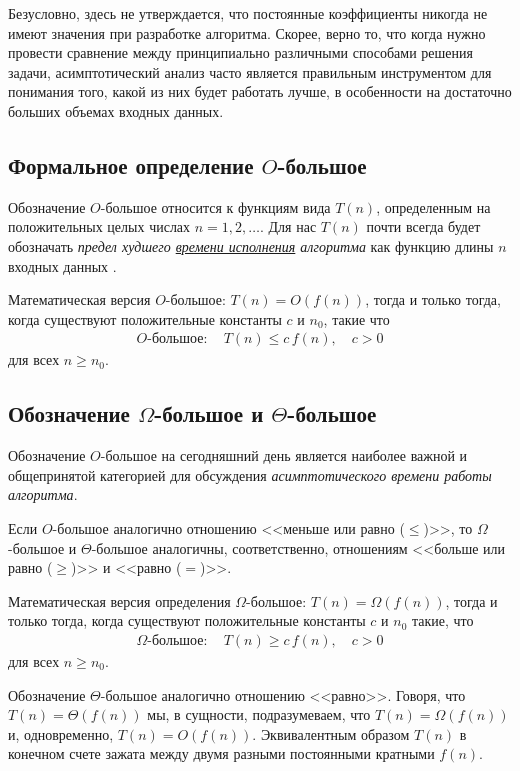 \documentclass[%
	11pt,
	a4paper,
	utf8,
		]{article}
\begin{document}
Безусловно, здесь не утверждается, что постоянные коэффициенты никогда не имеют значения при разработке алгоритма. Скорее, верно то, что когда нужно провести сравнение между принципиально различными способами решения задачи, асимптотический анализ часто является правильным инструментом для понимания того, какой из них будет работать лучше, в особенности на достаточно больших объемах входных данных.

\subsection{Формальное определение $ O $-большое}

Обозначение $ O $-большое относится к функциям вида $ T(n) $, определенным на положительных целых числах $ n = 1, 2, \dots $. Для нас $ T(n) $ почти всегда будет обозначать \emph{предел худшего \underline{времени исполнения} алгоритма} как функцию длины $ n $ входных данных \cite[74]{roughgarden:2019}.

Математическая версия $ O $-большое: $ T(n) = O(f(n)) $, тогда и только тогда, когда существуют положительные константы $ c $ и $ n_0 $, такие что
\begin{align*}
	O\textit{-большое}:\quad T(n) \leqslant c\,f(n), \quad c > 0
\end{align*}
для всех $ n \geqslant n_0 $.

\subsection{Обозначение $ \Omega $-большое и $ \Theta $-большое}

Обозначение $ O $-большое на сегодняшний день является наиболее важной и общепринятой категорией для обсуждения \emph{асимптотического времени работы алгоритма}.

Если $ O $-большое аналогично отношению <<меньше или равно ($ \leqslant $)>>, то $ \Omega $-большое и $ \Theta $-большое аналогичны, соответственно, отношениям <<больше или равно ($ \geqslant $)>> и <<равно ($ = $)>>.

Математическая версия определения $ \Omega $-большое: $ T(n) = \Omega(f(n)) $, тогда и только тогда, когда существуют положительные константы $ c $ и $ n_0 $ такие, что
\begin{align*}
	\Omega\textit{-большое}: \quad T(n) \geqslant c\,f(n), \quad c > 0
\end{align*}
для всех $ n \geqslant n_0 $.

Обозначение $ \Theta $-большое аналогично отношению <<равно>>. Говоря, что $ T(n) = \Theta(f(n)) $ мы, в сущности, подразумеваем, что $ T(n) = \Omega(f(n)) $ и, одновременно, $ T(n) = O(f(n)) $. Эквивалентным образом $ T(n) $ в конечном счете зажата между двумя разными постоянными кратными $ f(n) $.
\end{document}
